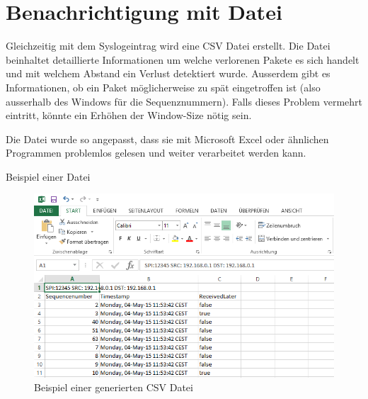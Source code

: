 \section{ Benachrichtigung mit Datei}

\noindent Gleichzeitig mit dem Syslogeintrag wird eine CSV Datei erstellt. Die Datei beinhaltet detaillierte Informationen um welche verlorenen Pakete es sich handelt und mit welchem Abstand ein Verlust detektiert wurde. Ausserdem gibt es Informationen, ob ein Paket möglicherweise zu spät eingetroffen ist (also ausserhalb des Windows für die Sequenznummern). Falls dieses Problem vermehrt eintritt, könnte ein Erhöhen der Window-Size nötig sein.

\noindent Die Datei wurde so angepasst, dass sie mit Microsoft Excel oder ähnlichen Programmen problemlos gelesen und weiter verarbeitet werden kann.

\noindent Beispiel einer Datei

\begin{figure}[H]
    \begin{center}
        \includegraphics[trim=1 0 0 0,clip,width=\textwidth]{start/img/Datei.png}
    \end{center}
    \caption{Beispiel einer generierten CSV Datei}
\end{figure}